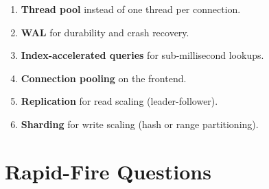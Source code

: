 \begin{interviewbox}
\begin{enumerate}[nosep]
  \item \textbf{Thread pool} instead of one thread per connection.
  \item \textbf{WAL} for durability and crash recovery.
  \item \textbf{Index-accelerated queries} for sub-millisecond lookups.
  \item \textbf{Connection pooling} on the frontend.
  \item \textbf{Replication} for read scaling (leader-follower).
  \item \textbf{Sharding} for write scaling (hash or range partitioning).
\end{enumerate}
\end{interviewbox}

\section{Rapid-Fire Questions}

